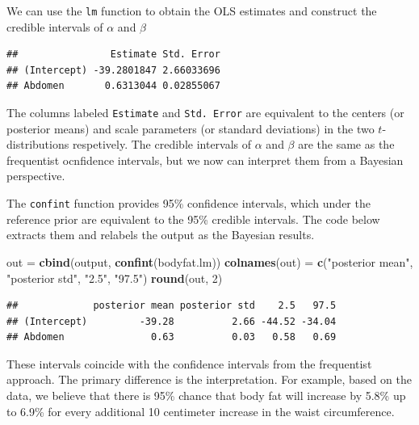 \documentclass[]{book}
\newenvironment{Shaded}{\begin{snugshade}}{\end{snugshade}}
\newcommand{\KeywordTok}[1]{\textcolor[rgb]{0.13,0.29,0.53}{\textbf{#1}}}
\newcommand{\DecValTok}[1]{\textcolor[rgb]{0.00,0.00,0.81}{#1}}
\newcommand{\StringTok}[1]{\textcolor[rgb]{0.31,0.60,0.02}{#1}}
\newcommand{\OperatorTok}[1]{\textcolor[rgb]{0.81,0.36,0.00}{\textbf{#1}}}
\newcommand{\NormalTok}[1]{#1}
\theoremstyle{definition}
\theoremstyle{definition}
\theoremstyle{definition}
\theoremstyle{remark}
\begin{document}
We can use the \texttt{lm} function to obtain the OLS estimates and
construct the credible intervals of \(\alpha\) and \(\beta\)

\begin{Shaded}
\end{Shaded}

\begin{verbatim}
##                Estimate Std. Error
## (Intercept) -39.2801847 2.66033696
## Abdomen       0.6313044 0.02855067
\end{verbatim}

The columns labeled \texttt{Estimate} and \texttt{Std.\ Error} are
equivalent to the centers (or posterior means) and scale parameters (or
standard deviations) in the two \(t\)-distributions respetively. The
credible intervals of \(\alpha\) and \(\beta\) are the same as the
frequentist ocnfidence intervals, but we now can interpret them from a
Bayesian perspective.

The \texttt{confint} function provides 95\% confidence intervals, which
under the reference prior are equivalent to the 95\% credible intervals.
The code below extracts them and relabels the output as the Bayesian
results.

\begin{Shaded}
\begin{Highlighting}[]
\NormalTok{out =}\StringTok{ }\KeywordTok{cbind}\NormalTok{(output, }\KeywordTok{confint}\NormalTok{(bodyfat.lm))}
\KeywordTok{colnames}\NormalTok{(out) =}\StringTok{ }\KeywordTok{c}\NormalTok{(}\StringTok{"posterior mean"}\NormalTok{, }\StringTok{"posterior std"}\NormalTok{, }\StringTok{"2.5"}\NormalTok{, }\StringTok{"97.5"}\NormalTok{)}
\KeywordTok{round}\NormalTok{(out, }\DecValTok{2}\NormalTok{)}
\end{Highlighting}
\end{Shaded}

\begin{verbatim}
##             posterior mean posterior std    2.5   97.5
## (Intercept)         -39.28          2.66 -44.52 -34.04
## Abdomen               0.63          0.03   0.58   0.69
\end{verbatim}

These intervals coincide with the confidence intervals from the
frequentist approach. The primary difference is the interpretation. For
example, based on the data, we believe that there is 95\% chance that
body fat will increase by 5.8\% up to 6.9\% for every additional 10
centimeter increase in the waist circumference.
\end{document}
